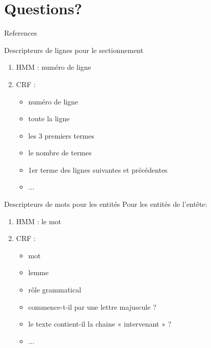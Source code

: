 \documentclass[newPxFont,pagenumber]{beamer}
\begin{document}
\section{Questions?}
\begin{frame}[t,allowframebreaks]{References}
\tiny

	
\end{frame}

\begin{frame}[c]{Descripteurs de lignes pour le sectionnement}
\label{seqTagFeatures}
\begin{enumerate}
\item HMM : numéro de ligne
\item CRF : 
\begin{itemize}
\item numéro de ligne
\item toute la ligne
\item les 3 premiers termes
\item le nombre de termes
\item 1er terme des lignes suivantes et précédentes
\item ...
\end{itemize}
\end{enumerate}
\end{frame}

\begin{frame}[c]{Descripteurs de mots pour les entités}
Pour les entités de l'entête:
\begin{enumerate}
\item HMM : le mot
\item CRF : 
\begin{itemize}
\item mot
\item lemme
\item rôle grammatical
\item commence-t-il par une lettre majuscule ?
\item le texte contient-il la chaine « intervenant » ?
\item ...
\end{itemize}
\end{enumerate}
\end{frame}
\end{document}
